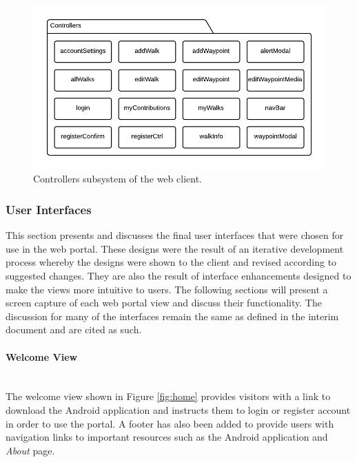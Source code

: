 \documentclass[11pt,a4paper]{report}
\begin{document}
\begin{figure}[H]
\centering
\includegraphics[width=0.8\linewidth]{./img/web-client-uml/controllers-subsystem-diagram}
\caption{Controllers subsystem of the web client.}
\label{fig:controllers-subsystem-diagram}
\end{figure}


\subsubsection{User Interfaces}
\label{sec:portal-user-interfaces}

This section presents and discusses the final user interfaces that were chosen for use in the web portal. These designs were the result of an iterative development process whereby the designs were shown to the client and revised according to suggested changes. They are also the result of interface enhancements designed to make the views more intuitive to users. The following sections will present a screen capture of each web portal view and discuss their functionality. The discussion for many of the interfaces remain the same as defined in the interim document and are cited as such.

\paragraph{Welcome View}\mbox{}\\
The welcome view shown in Figure \ref{fig:home} provides visitors with a link to download the Android application and instructs them to login or register account in order to use the portal. A footer has also been added to provide users with navigation links to important resources such as the Android application and \emph{About} page\cite{milestone2}.
\end{document}

